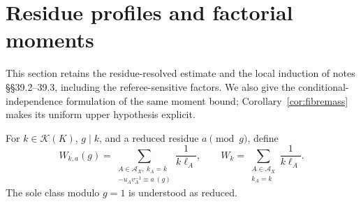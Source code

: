 \documentclass[10pt,reqno]{amsart}
\theoremstyle{remark}
\newcommand{\K}{\mathcal K}
\newcommand{\A}{\mathcal A}
\begin{document}
\section{Residue profiles and factorial moments}\label{sec:moments}
This section retains the residue-resolved estimate and the local induction
of notes \S\S39.2--39.3, including the referee-sensitive factors.  We also
give the conditional-independence formulation of the same moment bound;
Corollary~\ref{cor:fibremass} makes its uniform upper hypothesis explicit.

For $k\in\K(K)$, $g\mid k$, and a reduced residue $a\pmod g$, define
\[
 W_{k,a}(g)=\sum_{\substack{A\in\A_X,\ k_A=k\\-u_Av_A^{-1}\equiv a\ (g)}}
                    \frac1{k\ell_A},\qquad
 W_k=\sum_{\substack{A\in\A_X\\k_A=k}}\frac1{k\ell_A}.
\]
The sole class modulo $g=1$ is understood as reduced.
\end{document}
